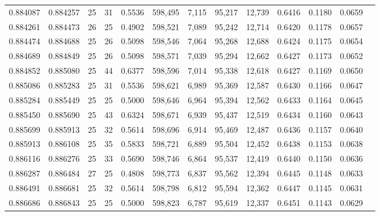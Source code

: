 \begin{tabular}{rrrrrrrrrrrrr}
0.884087 & 0.884257 &    25 &  31 &                                     0.5536 & 598,495 &   7,115 &  95,217 &  12,739 & 0.6416 & 0.1180 & 0.0659 \\
0.884261 & 0.884473 &    26 &  25 &                                     0.4902 & 598,521 &   7,089 &  95,242 &  12,714 & 0.6420 & 0.1178 & 0.0657 \\
0.884474 & 0.884688 &    25 &  26 &                                     0.5098 & 598,546 &   7,064 &  95,268 &  12,688 & 0.6424 & 0.1175 & 0.0654 \\
0.884689 & 0.884849 &    25 &  26 &                                     0.5098 & 598,571 &   7,039 &  95,294 &  12,662 & 0.6427 & 0.1173 & 0.0652 \\
0.884852 & 0.885080 &    25 &  44 &                                     0.6377 & 598,596 &   7,014 &  95,338 &  12,618 & 0.6427 & 0.1169 & 0.0650 \\
0.885086 & 0.885283 &    25 &  31 &                                     0.5536 & 598,621 &   6,989 &  95,369 &  12,587 & 0.6430 & 0.1166 & 0.0647 \\
0.885284 & 0.885449 &    25 &  25 &                                     0.5000 & 598,646 &   6,964 &  95,394 &  12,562 & 0.6433 & 0.1164 & 0.0645 \\
0.885450 & 0.885690 &    25 &  43 &                                     0.6324 & 598,671 &   6,939 &  95,437 &  12,519 & 0.6434 & 0.1160 & 0.0643 \\
0.885699 & 0.885913 &    25 &  32 &                                     0.5614 & 598,696 &   6,914 &  95,469 &  12,487 & 0.6436 & 0.1157 & 0.0640 \\
0.885913 & 0.886108 &    25 &  35 &                                     0.5833 & 598,721 &   6,889 &  95,504 &  12,452 & 0.6438 & 0.1153 & 0.0638 \\
0.886116 & 0.886276 &    25 &  33 &                                     0.5690 & 598,746 &   6,864 &  95,537 &  12,419 & 0.6440 & 0.1150 & 0.0636 \\
0.886287 & 0.886484 &    27 &  25 &                                     0.4808 & 598,773 &   6,837 &  95,562 &  12,394 & 0.6445 & 0.1148 & 0.0633 \\
0.886491 & 0.886681 &    25 &  32 &                                     0.5614 & 598,798 &   6,812 &  95,594 &  12,362 & 0.6447 & 0.1145 & 0.0631 \\
0.886686 & 0.886843 &    25 &  25 &                                     0.5000 & 598,823 &   6,787 &  95,619 &  12,337 & 0.6451 & 0.1143 & 0.0629 \\

\end{tabular}
